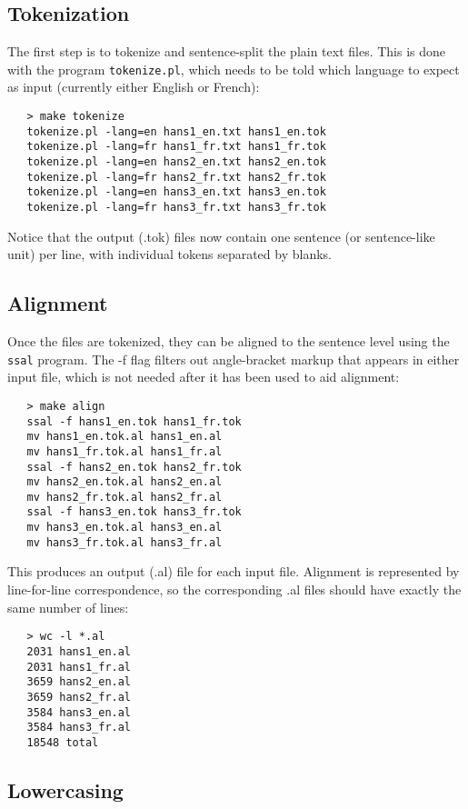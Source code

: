 \documentclass[11pt]{article}
\begin{document}
\subsection{Tokenization} \label{Tokenization}

The first step is to tokenize and sentence-split the plain text files. This
is done with the program {\tt tokenize.pl}, which needs to be told which
language to expect as input (currently either English or French):
\begin{verbatim}
   > make tokenize
   tokenize.pl -lang=en hans1_en.txt hans1_en.tok
   tokenize.pl -lang=fr hans1_fr.txt hans1_fr.tok
   tokenize.pl -lang=en hans2_en.txt hans2_en.tok
   tokenize.pl -lang=fr hans2_fr.txt hans2_fr.tok
   tokenize.pl -lang=en hans3_en.txt hans3_en.tok
   tokenize.pl -lang=fr hans3_fr.txt hans3_fr.tok
\end{verbatim}
Notice that the output (.tok) files now contain one sentence (or sentence-like
unit) per line, with individual tokens separated by blanks.

\subsection{Alignment} \label{Alignment}

Once the files are tokenized, they can be aligned to the sentence level using
the {\tt ssal} program. The -f flag filters out angle-bracket markup that
appears in either input file, which is not needed after it has been used to aid
alignment:
\begin{verbatim}
   > make align
   ssal -f hans1_en.tok hans1_fr.tok
   mv hans1_en.tok.al hans1_en.al
   mv hans1_fr.tok.al hans1_fr.al
   ssal -f hans2_en.tok hans2_fr.tok
   mv hans2_en.tok.al hans2_en.al
   mv hans2_fr.tok.al hans2_fr.al
   ssal -f hans3_en.tok hans3_fr.tok
   mv hans3_en.tok.al hans3_en.al
   mv hans3_fr.tok.al hans3_fr.al
\end{verbatim}
This produces an output (.al) file for each input file. Alignment is
represented by line-for-line correspondence, so the corresponding .al files
should have exactly the same number of lines:
\begin{verbatim}
   > wc -l *.al
   2031 hans1_en.al
   2031 hans1_fr.al
   3659 hans2_en.al
   3659 hans2_fr.al
   3584 hans3_en.al
   3584 hans3_fr.al
   18548 total
\end{verbatim}

\subsection{Lowercasing} \label{Lowercasing}
\end{document}
